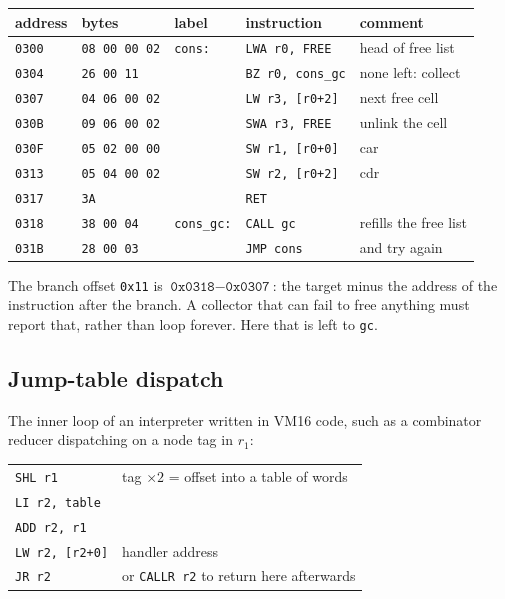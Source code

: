 \documentclass[11pt,a4paper]{article}
\newcommand{\vm}{VM16}
\newcommand{\op}[1]{\texttt{#1}}
\newcommand{\hx}[1]{\texttt{0x#1}}
\newcommand{\R}[1]{r_{#1}}
\begin{document}
\begin{center}
\small
\begin{tabular}{@{}l l l l l@{}}
\toprule
address & bytes & label & instruction & comment\\
\midrule
\texttt{0300} & \texttt{08 00 00 02} & \texttt{cons:} & \op{LWA r0, FREE} & head of free list\\
\texttt{0304} & \texttt{26 00 11} & & \op{BZ r0, cons\_gc} & none left: collect\\
\texttt{0307} & \texttt{04 06 00 02} & & \op{LW r3, [r0+2]} & next free cell\\
\texttt{030B} & \texttt{09 06 00 02} & & \op{SWA r3, FREE} & unlink the cell\\
\texttt{030F} & \texttt{05 02 00 00} & & \op{SW r1, [r0+0]} & car\\
\texttt{0313} & \texttt{05 04 00 02} & & \op{SW r2, [r0+2]} & cdr\\
\texttt{0317} & \texttt{3A} & & \op{RET} & \\
\texttt{0318} & \texttt{38 00 04} & \texttt{cons\_gc:} & \op{CALL gc} & refills the free list\\
\texttt{031B} & \texttt{28 00 03} & & \op{JMP cons} & and try again\\
\bottomrule
\end{tabular}
\end{center}

The branch offset \hx{11} is $\hx{0318} - \hx{0307}$: the target
minus the address of the instruction after the branch. A collector that can
fail to free anything must report that, rather than loop forever. Here that is
left to \texttt{gc}.

\subsection{Jump-table dispatch}

The inner loop of an interpreter written in \vm{} code, such as a combinator
reducer dispatching on a node tag in $\R{1}$:
\begin{center}
\small
\begin{tabular}{@{}l l@{}}
\op{SHL r1} & tag $\times 2$ = offset into a table of words\\
\op{LI r2, table} & \\
\op{ADD r2, r1} & \\
\op{LW r2, [r2+0]} & handler address\\
\op{JR r2} & or \op{CALLR r2} to return here afterwards\\
\end{tabular}
\end{center}
\end{document}

